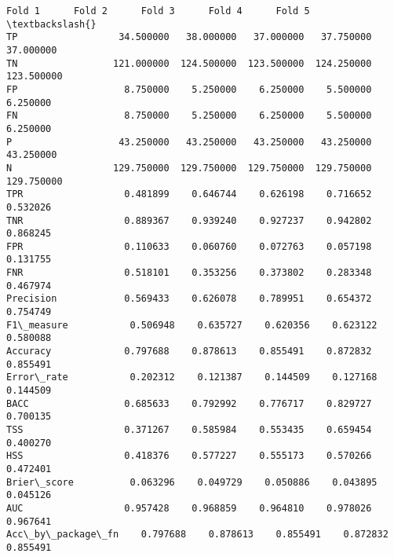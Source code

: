\documentclass[11pt]{article}
\makeatletter
\newcommand{\boxspacing}{\kern\kvtcb@left@rule\kern\kvtcb@boxsep}
\newcommand{\prompt}[4]{
        {\ttfamily\llap{{\color{#2}[#3]:\hspace{3pt}#4}}\vspace{-\baselineskip}}
    }
\makeatother
\begin{document}
            \begin{tcolorbox}[breakable, size=fbox, boxrule=.5pt, pad at break*=1mm, opacityfill=0]
\prompt{Out}{outcolor}{31}{\boxspacing}
\begin{Verbatim}[commandchars=\\\{\}]
                       Fold 1      Fold 2      Fold 3      Fold 4      Fold 5  \textbackslash{}
TP                  34.500000   38.000000   37.000000   37.750000   37.000000
TN                 121.000000  124.500000  123.500000  124.250000  123.500000
FP                   8.750000    5.250000    6.250000    5.500000    6.250000
FN                   8.750000    5.250000    6.250000    5.500000    6.250000
P                   43.250000   43.250000   43.250000   43.250000   43.250000
N                  129.750000  129.750000  129.750000  129.750000  129.750000
TPR                  0.481899    0.646744    0.626198    0.716652    0.532026
TNR                  0.889367    0.939240    0.927237    0.942802    0.868245
FPR                  0.110633    0.060760    0.072763    0.057198    0.131755
FNR                  0.518101    0.353256    0.373802    0.283348    0.467974
Precision            0.569433    0.626078    0.789951    0.654372    0.754749
F1\_measure           0.506948    0.635727    0.620356    0.623122    0.580088
Accuracy             0.797688    0.878613    0.855491    0.872832    0.855491
Error\_rate           0.202312    0.121387    0.144509    0.127168    0.144509
BACC                 0.685633    0.792992    0.776717    0.829727    0.700135
TSS                  0.371267    0.585984    0.553435    0.659454    0.400270
HSS                  0.418376    0.577227    0.555173    0.570266    0.472401
Brier\_score          0.063296    0.049729    0.050886    0.043895    0.045126
AUC                  0.957428    0.968859    0.964810    0.978026    0.967641
Acc\_by\_package\_fn    0.797688    0.878613    0.855491    0.872832    0.855491


\end{Verbatim}
\end{tcolorbox}
\end{document}
